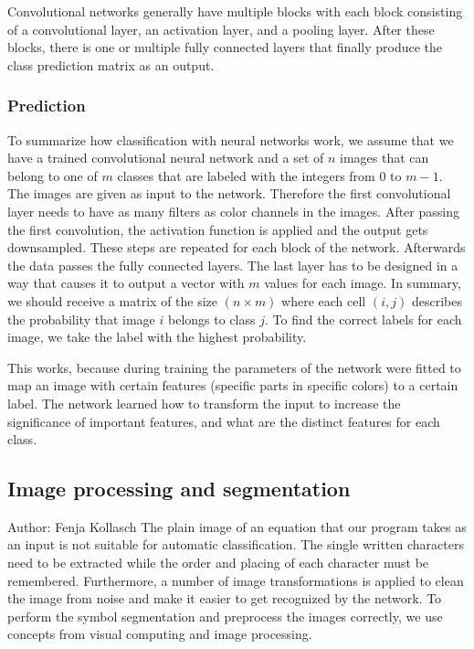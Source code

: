 \documentclass[11pt]{article}
\begin{document}
	Convolutional networks generally have multiple blocks with each block consisting of a convolutional layer, an activation layer, and a pooling layer. After these blocks, there is one or multiple fully connected layers that finally produce the class prediction matrix as an output.
	
	\subsubsection{Prediction}
	To summarize how classification with neural networks work, we assume that we have a trained convolutional neural network and a set of $n$ images that can belong to one of $m$ classes that are labeled with the integers from $0$ to $m-1$. The images are given as input to the network. Therefore the first convolutional layer needs to have as many filters as color channels in the images. After passing the first convolution, the activation function is applied and the output gets downsampled. These steps are repeated for each block of the network. Afterwards the data passes the fully connected layers. The last layer has to be designed in a way that causes it to output a vector with $m$ values for each image. In summary, we should receive a matrix of the size $(n \times m)$ where each cell $(i, j)$ describes the probability that image $i$ belongs to class $j$. To find the correct labels for each image, we take the label with the highest probability.
	
	This works, because during training the parameters of the network were fitted to map an image with certain features (specific parts in specific colors) to a certain label. The network learned how to transform the input to increase the significance of important features, and what are the distinct features for each class.
	

	\subsection{Image processing and segmentation}
	\small{Author: Fenja Kollasch} \newline \newline
	The plain image of an equation that our program takes as an input is not suitable for automatic classification. The single written characters need to be extracted while the order and placing of each character must be remembered. Furthermore, a number of image transformations is applied to clean the image from noise and make it easier to get recognized by the network. To perform the symbol segmentation and preprocess the images correctly, we use concepts from visual computing and image processing.	
\end{document}
